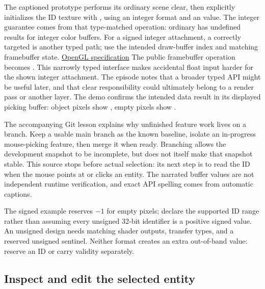 The captioned prototype performs its ordinary scene clear, then explicitly initializes the ID texture with , using an integer format and an  value. The integer guarantee comes from that type-matched operation: ordinary  has undefined results for integer color buffers. For a signed integer attachment, a correctly targeted  is another typed path; use the intended draw-buffer index and matching framebuffer state. \href{https://registry.khronos.org/OpenGL/specs/gl/glspec30.pdf}{OpenGL specification} The public framebuffer operation becomes . This narrowly typed interface makes accidental float input harder for the shown integer attachment. The episode notes that a broader typed API might be useful later, and that clear responsibility could ultimately belong to a render pass or another layer. The demo confirms the intended data result in its displayed picking buffer: object pixels show , empty pixels show .

The accompanying Git lesson explains why unfinished feature work lives on a branch. Keep a usable main branch as the known baseline, isolate an in-progress mouse-picking feature, then merge it when ready. Branching allows the development snapshot to be incomplete, but does not itself make that snapshot stable. This source stops before actual selection: its next step is to read the ID when the mouse points at or clicks an entity. The narrated buffer values are not independent runtime verification, and exact API spelling comes from automatic captions.

The signed  example reserves \(-1\) for empty pixels; declare the supported ID range rather than assuming every unsigned 32-bit identifier is a positive signed value. An unsigned  design needs matching shader outputs, transfer types, and a reserved unsigned sentinel. Neither format creates an extra out-of-band value: reserve an ID or carry validity separately.

\subsection{Inspect and edit the selected entity}\label{06-engine-ii-ch031-inspect-and-edit-the-selected-entity}

